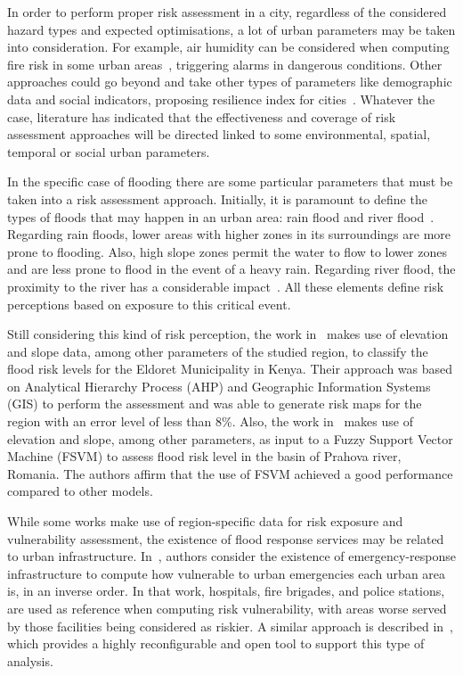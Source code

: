 \begin{refsection}
In order to perform proper risk assessment in a city, regardless of the considered hazard types and expected optimisations, a lot of urban parameters may be taken into consideration. For example, air humidity can be considered  when computing fire risk in some urban areas~\cite{fire1}, triggering alarms in dangerous conditions. Other approaches could go beyond and take other types of parameters like demographic data and social indicators, proposing resilience index for cities~\cite{redi}. Whatever the case, literature has indicated that the effectiveness and coverage of risk assessment approaches will be directed linked to some environmental, spatial, temporal or social urban parameters.

In the specific case of flooding there are some particular parameters that must be taken into a risk assessment approach. Initially, it is paramount to define the types of floods that may happen in an urban area: rain flood and river flood~\cite{elevation1}. Regarding rain floods, lower areas with higher zones in its surroundings are more prone to flooding. Also, high slope zones permit the water to flow to lower zones and are less prone to flood in the event of a heavy rain. Regarding river flood, the proximity to the river has a considerable impact~\cite{chapi2017novel}. All these elements define risk perceptions based on exposure to this critical event.

Still considering this kind of risk perception, the work in~\cite{elevation1} makes use of elevation and slope data, among other parameters of the studied region, to classify the flood risk levels for the Eldoret Municipality in Kenya. Their approach was based on Analytical Hierarchy Process (AHP) and Geographic Information Systems (GIS) to perform the assessment and was able to generate risk maps for the region with an error level of less than 8\%. Also, the work in~\cite{elevation2} makes use of elevation and slope, among other parameters, as input to a Fuzzy Support Vector Machine (FSVM) to assess flood risk level in the basin of Prahova river, Romania. The authors affirm that the use of FSVM achieved a good performance compared to other models.

While some works make use of region-specific data for risk exposure and vulnerability assessment, the existence of flood response services may be related to urban infrastructure. In~\cite{sensorsposition}, authors consider the existence of emergency-response infrastructure to compute how vulnerable to urban emergencies each urban area is, in an inverse order. In that work, hospitals, fire brigades, and police stations, are used as reference when computing risk vulnerability, with areas worse served by those facilities being considered as riskier. A similar approach is described in~\cite{cityzones}, which provides a highly reconfigurable and open tool to support this type of analysis.


\end{refsection}
